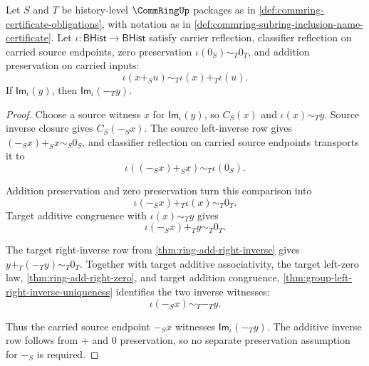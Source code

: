 \begin{theorem}
\label{thm:commring-subring-inclusion-inverse-closure}
Let $S$ and $T$ be history-level $\CommRingUp$ packages as in \autoref{def:commring-certificate-obligations}, with notation as in \autoref{def:commring-subring-inclusion-name-certificate}. Let $\iota:\mathsf{BHist}\to\mathsf{BHist}$ satisfy carrier reflection, classifier reflection on carried source endpoints, zero preservation $\iota(0_S)\sim_T0_T$, and addition preservation on carried inputs:
$$
\iota(x+_S u)\sim_T\iota(x)+_T\iota(u).
$$
If $\mathsf{Im}_{\iota}(y)$, then $\mathsf{Im}_{\iota}(-_T y)$.
\end{theorem}
\begin{proof}
Choose a source witness $x$ for $\mathsf{Im}_{\iota}(y)$, so $C_S(x)$ and $\iota(x)\sim_T y$. Source inverse closure gives $C_S(-_S x)$. The source left-inverse row gives $(-_S x)+_S x\sim_S0_S$, and classifier reflection on carried source endpoints transports it to
$$
\iota((-_S x)+_S x)\sim_T\iota(0_S).
$$

Addition preservation and zero preservation turn this comparison into
$$
\iota(-_S x)+_T\iota(x)\sim_T0_T.
$$
Target additive congruence with $\iota(x)\sim_T y$ gives
$$
\iota(-_S x)+_T y\sim_T0_T.
$$

The target right-inverse row from \autoref{thm:ring-add-right-inverse} gives $y+_T(-_T y)\sim_T0_T$. Together with target additive associativity, the target left-zero law, \autoref{thm:ring-add-right-zero}, and target addition congruence, \autoref{thm:group-left-right-inverse-uniqueness} identifies the two inverse witnesses:
$$
\iota(-_S x)\sim_T -_T y.
$$

Thus the carried source endpoint $-_S x$ witnesses $\mathsf{Im}_{\iota}(-_T y)$. The additive inverse row follows from $+$ and $0$ preservation, so no separate preservation assumption for $-_S$ is required.
\end{proof}

